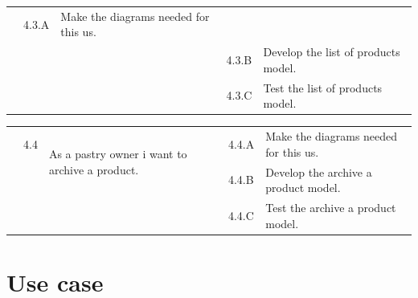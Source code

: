 \documentclass[12pt,a4paper]{report}
\begin{document}
\begin{table}[H]
\begin{center}
\begin{tabular}{|  p{3cm}|  p{1cm}| p{4cm}|  p{1cm}| p{6cm}|}
				&				                      
				4.3.A &                        
				Make the diagrams needed for this \ac{us}.
				\\ 
				\cline{4-5}    
				&                   
				&                                 
				&                        
				4.3.B &                        
				Develop the list of products model.
				\\ 
				\cline{4-5}    
				&                   
				&                                 
				&                        
				4.3.C &                        
				Test the list of products model.
			
				
				
				
			\end{tabular}
			
		\end{center}
		
	\end{table}
	\begin{table}[H]
	\begin{center}
		\setlength\doublerulesep{0.5pt}
		\begin{tabular}{|  p{3cm}|  p{1cm}| p{4cm}|  p{1cm}| p{6cm}|}
			
		
		\cline{2-5}  
		
		&                       
		4.4  &  
		\multirow{2}{4cm}{As a pastry owner i want to archive a product.}
		
		&				                      
		4.4.A &                        
		Make the diagrams needed for this \ac{us}.
		\\ 
		\cline{4-5}    
		&                   
		&                                 
		&                        
		4.4.B &                        
		Develop the archive a product model.
		\\ 
		\cline{4-5}    
		&                   
		&                                 
		&                        
		4.4.C &                        
		Test the archive a product model.
		
		\\
		\hline
			
		\end{tabular}
		
	\end{center}
	
\end{table}
\section{Use case}
\end{document}
